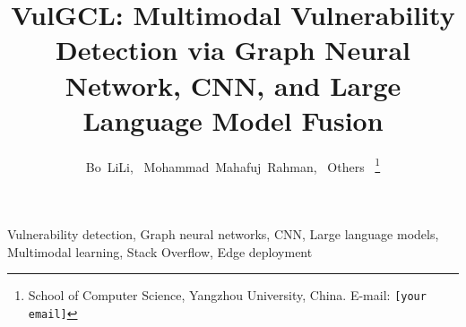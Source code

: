 \documentclass[10pt, journal]{IEEEtran}
\title{VulGCL: Multimodal Vulnerability Detection via Graph Neural Network,
       CNN, and Large Language Model Fusion}
\author{
  Bo~LiLi,~\IEEEmembership{}
  Mohammad~Mahafuj~Rahman,~\IEEEmembership{}
  Others~\IEEEmembership{}
  \thanks{School of Computer Science, Yangzhou University, China.
  E-mail: \texttt{[your email]}}
}
\begin{document}
\maketitle

\begin{abstract}

\end{abstract}

\begin{IEEEkeywords}
Vulnerability detection, Graph neural networks, CNN, Large language models,
Multimodal learning, Stack Overflow, Edge deployment
\end{IEEEkeywords}










\end{document}

